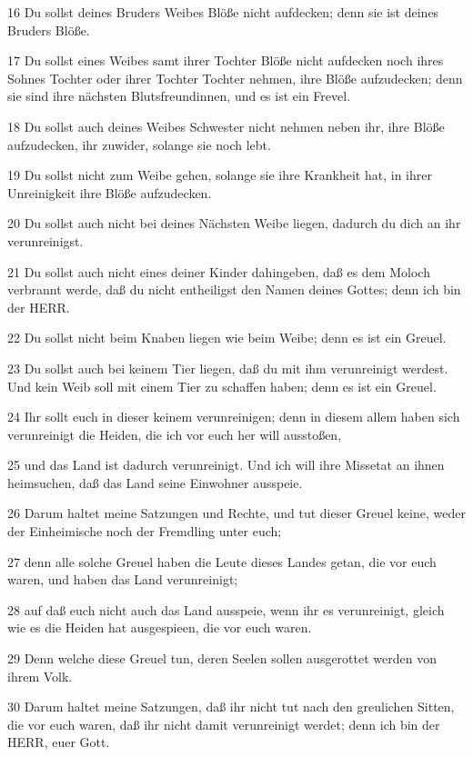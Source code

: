\par 16 Du sollst deines Bruders Weibes Blöße nicht aufdecken; denn sie ist deines Bruders Blöße.
\par 17 Du sollst eines Weibes samt ihrer Tochter Blöße nicht aufdecken noch ihres Sohnes Tochter oder ihrer Tochter Tochter nehmen, ihre Blöße aufzudecken; denn sie sind ihre nächsten Blutsfreundinnen, und es ist ein Frevel.
\par 18 Du sollst auch deines Weibes Schwester nicht nehmen neben ihr, ihre Blöße aufzudecken, ihr zuwider, solange sie noch lebt.
\par 19 Du sollst nicht zum Weibe gehen, solange sie ihre Krankheit hat, in ihrer Unreinigkeit ihre Blöße aufzudecken.
\par 20 Du sollst auch nicht bei deines Nächsten Weibe liegen, dadurch du dich an ihr verunreinigst.
\par 21 Du sollst auch nicht eines deiner Kinder dahingeben, daß es dem Moloch verbrannt werde, daß du nicht entheiligst den Namen deines Gottes; denn ich bin der HERR.
\par 22 Du sollst nicht beim Knaben liegen wie beim Weibe; denn es ist ein Greuel.
\par 23 Du sollst auch bei keinem Tier liegen, daß du mit ihm verunreinigt werdest. Und kein Weib soll mit einem Tier zu schaffen haben; denn es ist ein Greuel.
\par 24 Ihr sollt euch in dieser keinem verunreinigen; denn in diesem allem haben sich verunreinigt die Heiden, die ich vor euch her will ausstoßen,
\par 25 und das Land ist dadurch verunreinigt. Und ich will ihre Missetat an ihnen heimsuchen, daß das Land seine Einwohner ausspeie.
\par 26 Darum haltet meine Satzungen und Rechte, und tut dieser Greuel keine, weder der Einheimische noch der Fremdling unter euch;
\par 27 denn alle solche Greuel haben die Leute dieses Landes getan, die vor euch waren, und haben das Land verunreinigt;
\par 28 auf daß euch nicht auch das Land ausspeie, wenn ihr es verunreinigt, gleich wie es die Heiden hat ausgespieen, die vor euch waren.
\par 29 Denn welche diese Greuel tun, deren Seelen sollen ausgerottet werden von ihrem Volk.
\par 30 Darum haltet meine Satzungen, daß ihr nicht tut nach den greulichen Sitten, die vor euch waren, daß ihr nicht damit verunreinigt werdet; denn ich bin der HERR, euer Gott.

